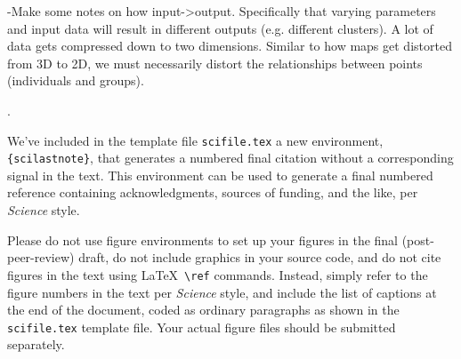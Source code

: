 \documentclass[12pt]{article}
\newcounter{lastnote}
\newenvironment{scilastnote}{%
\setcounter{lastnote}{\value{enumiv}}%
\addtocounter{lastnote}{+1}%
\begin{list}%
{\arabic{lastnote}.}
{\setlength{\leftmargin}{.22in}}
{\setlength{\labelsep}{.5em}}}
{\end{list}}
\begin{document}
-Make some notes on how input->output. Specifically that varying parameters and input data will result in different outputs (e.g. different clusters). A lot of data gets compressed down to two dimensions. Similar to how maps get distorted from 3D to 2D, we must necessarily distort the relationships between points (individuals and groups).










\begin{scilastnote}
\item We've included in the template file \texttt{scifile.tex} a new
environment, \texttt{\{scilastnote\}}, that generates a numbered final
citation without a corresponding signal in the text.  This environment
can be used to generate a final numbered reference containing
acknowledgments, sources of funding, and the like, per {\it Science\/}
style.
\end{scilastnote}






\clearpage

 Please do not use figure environments to set
up your figures in the final (post-peer-review) draft, do not include graphics in your
source code, and do not cite figures in the text using \LaTeX\
\verb+\ref+ commands.  Instead, simply refer to the figure numbers in
the text per {\it Science\/} style, and include the list of captions at
the end of the document, coded as ordinary paragraphs as shown in the
\texttt{scifile.tex} template file.  Your actual figure files should
be submitted separately.
\end{document}
